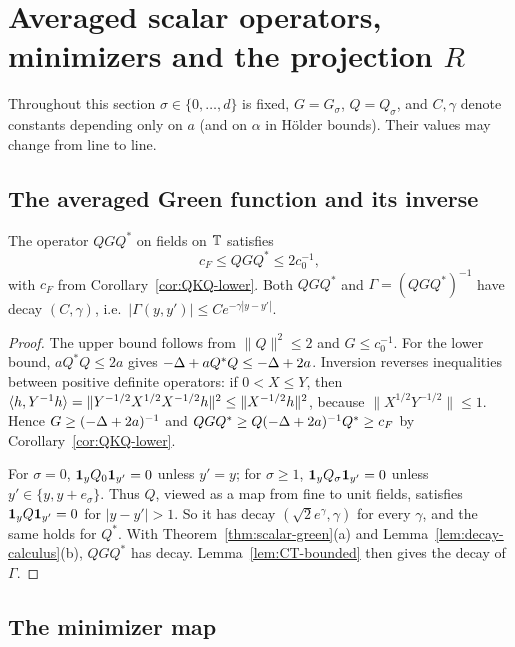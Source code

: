 \section{Averaged scalar operators, minimizers and the projection \texorpdfstring{$R$}{R}}\label{sec:scalar-avg}

Throughout this section $\sigma\in\{0,\dots,d\}$ is fixed, $G=G_\sigma$, $Q=Q_\sigma$, and $C,\gamma$ denote constants depending only on $a$ (and on $\alpha$ in H\"older bounds). Their values may change from line to line.

\subsection{The averaged Green function and its inverse}\label{ss:8.1}

\begin{proposition}\label{prop:QGQ}
The operator $QGQ^*$ on fields on $\mathbb T$ satisfies
\[
c_F\le QGQ^*\le 2c_0^{-1},
\]
with $c_F$ from Corollary~\ref{cor:QKQ-lower}. Both $QGQ^*$ and $\Gamma=(QGQ^*)^{-1}$ have decay $(C,\gamma)$, i.e.\ $|\Gamma(y,y')|\le Ce^{-\gamma|y-y'|}$.
\end{proposition}

\begin{proof}
The upper bound follows from $\|Q\|^2\le2$ and $G\le c_0^{-1}$. For the lower bound, $aQ^*Q\le2a$ gives $-\Delta+aQ^*Q\le-\Delta+2a$. Inversion reverses inequalities between positive definite operators: if $0<X\le Y$, then $\langle h,Y^{-1}h\rangle=\|Y^{-1/2}X^{1/2}X^{-1/2}h\|^2\le\|X^{-1/2}h\|^2$, because $\|X^{1/2}Y^{-1/2}\|\le1$. Hence $G\ge(-\Delta+2a)^{-1}$ and $QGQ^*\ge Q(-\Delta+2a)^{-1}Q^*\ge c_F$ by Corollary~\ref{cor:QKQ-lower}.

For $\sigma=0$, $\mathbf 1_yQ_0\mathbf 1_{y'}=0$ unless $y'=y$; for $\sigma\ge1$, $\mathbf 1_yQ_\sigma\mathbf 1_{y'}=0$ unless $y'\in\{y,y+e_\sigma\}$. Thus $Q$, viewed as a map from fine to unit fields, satisfies $\mathbf 1_yQ\mathbf 1_{y'}=0$ for $|y-y'|>1$. So it has decay $(\sqrt2e^{\gamma},\gamma)$ for every $\gamma$, and the same holds for $Q^*$. With Theorem~\ref{thm:scalar-green}(a) and Lemma~\ref{lem:decay-calculus}(b), $QGQ^*$ has decay. Lemma~\ref{lem:CT-bounded} then gives the decay of $\Gamma$.
\end{proof}

\subsection{The minimizer map}\label{ss:8.2}

